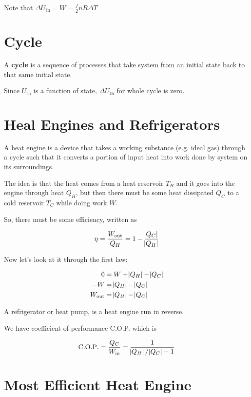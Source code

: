 Note that $\Delta U_\mathrm{th} = W = \frac{f}{2} nR\Delta T$

\section{Cycle}

A \textbf{cycle} is a sequence of processes that take system from an initial state back to that same initial state.

Since $U_\mathrm{th}$ is a function of state, $\Delta U_\mathrm{th}$ for whole cycle is zero.

\section{Heal Engines and Refrigerators}

A heat engine is a device that takes a working substance (e.g. ideal gas) through a cycle such that it converts a portion of input heat into work done by system on its surroundings.

The idea is that the heat comes from a heat reservoir $T_H$ and it goes into the engine through heat $Q_H$, but then there must be some heat dissipated $Q_C$ to a cold reservoir $T_C$ while doing work $W$.

So, there must be some efficiency, written as

\begin{equation}
	\eta = \frac{W_\mathrm{out}}{Q_H} = 1 - \frac{\abs{Q_C}}{\abs{Q_H}}
\end{equation}

Now let's look at it through the first law:

\begin{align}
	0 &= W + \abs{Q_H} - \abs{Q_C}\\
	-W &= \abs{Q_H} - \abs{Q_C}\\
	W_\mathrm{out} &= \abs{Q_H} - \abs{Q_C}
\end{align}

A refrigerator or heat pump, is a heat engine run in reverse.

We have coefficient of performance C.O.P. which is

\begin{equation}
	\mathrm{C.O.P.} = \frac{Q_C}{W_\mathrm{in}} = \frac{1}{\abs{Q_H} / \abs{Q_C} - 1}
\end{equation}

\section{Most Efficient Heat Engine}

